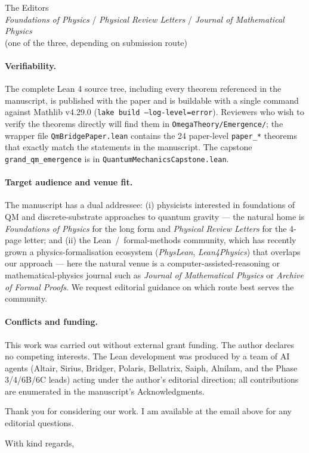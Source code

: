 \documentclass[11pt,a4paper]{letter}
\begin{document}
\begin{letter}{%
  The Editors\\
  \emph{Foundations of Physics} / \emph{Physical Review Letters} / \emph{Journal of Mathematical Physics}\\
  (one of the three, depending on submission route)}
\paragraph{Verifiability.}
The complete Lean 4 source tree, including every theorem referenced
in the manuscript, is published with the paper and is buildable with
a single command against Mathlib v4.29.0
(\texttt{lake build --log-level=error}). Reviewers who wish to verify
the theorems directly will find them in
\texttt{OmegaTheory/Emergence/}; the wrapper file
\texttt{QmBridgePaper.lean} contains the 24 paper-level
\texttt{paper\_*} theorems that exactly match the statements in the
manuscript. The capstone \texttt{grand\_qm\_emergence} is in
\texttt{QuantumMechanicsCapstone.lean}.

\paragraph{Target audience and venue fit.}
The manuscript has a dual addressee: (i) physicists interested in
foundations of QM and discrete-substrate approaches to quantum
gravity --- the natural home is \emph{Foundations of Physics} for the
long form and \emph{Physical Review Letters} for the 4-page letter;
and (ii) the Lean~/~formal-methods community, which has recently
grown a physics-formalisation ecosystem (\emph{PhysLean},
\emph{Lean4Physics}) that overlaps our approach --- here the natural
venue is a computer-assisted-reasoning or mathematical-physics journal
such as \emph{Journal of Mathematical Physics} or \emph{Archive of
Formal Proofs}. We request editorial guidance on which route best
serves the community.

\paragraph{Conflicts and funding.}
This work was carried out without external grant funding. The author
declares no competing interests. The Lean development was produced
by a team of AI agents (Altair, Sirius, Bridger, Polaris, Bellatrix,
Saiph, Alnilam, and the Phase 3/4/6B/6C leads) acting under the
author's editorial direction; all contributions are enumerated in
the manuscript's Acknowledgments.

Thank you for considering our work. I am available at the email
above for any editorial questions.

\closing{With kind regards,}

\end{letter}
\end{document}
